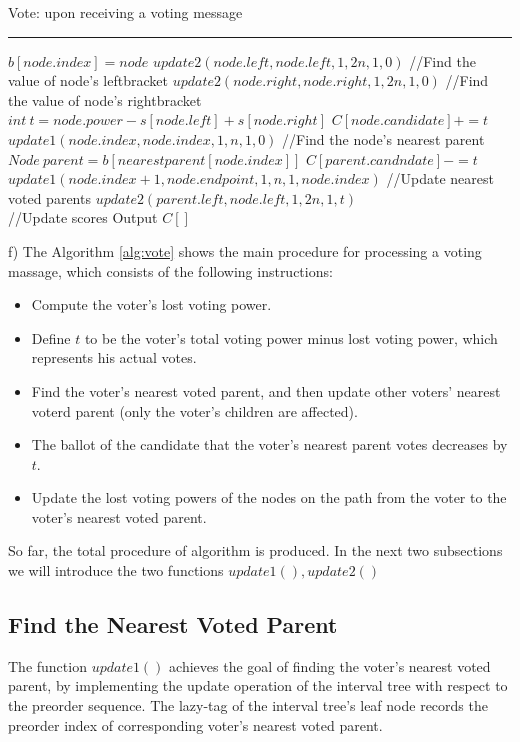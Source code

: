 \begin{algorithm}
	\caption{Vote: upon receiving a voting message}%
	\hrule
	
	$b[node.index]=node$\;
	$update2(node.left,node.left,1,2n,1,0)${\color{gray}
		//Find the value of node's leftbracket}\;
	$update2(node.right,node.right,1,2n,1,0)${\color{gray}
		//Find the value of node's rightbracket}\;
	$int~t=node.power-s[node.left]+s[node.right]$\;
	$C[node.candidate]+=t$\;
	$update1(node.index,node.index,1,n,1,0)${\color{gray}
		//Find the node's nearest parent}\;
	$Node~parent = b[nearestparent[node.index]]$\;
	$C[parent.candndate]-=t$\;
	$update1(node.index+1,node.endpoint,1,n,1,node.index)${\color{gray}
		//Update nearest voted parents}\;
	$update2(parent.left,node.left,1,2n,1,t)${\color{gray}
		\\//Update scores}\;
	Output $C[]$
	\label{alg:vote}
\end{algorithm}

f) The Algorithm \ref{alg:vote} shows the main procedure for processing a voting massage, which consists of the following instructions: 
\begin{itemize}
	\item Compute the voter's lost voting power.
	\item Define $t$ to be the voter's total voting power minus lost voting power, which represents his actual votes. 
	\item Find the voter's nearest voted parent, and then update other voters' nearest voterd parent (only the voter's children are affected).
	\item The ballot of the candidate that the voter's nearest parent votes decreases by $t$.
	\item Update the lost voting powers of the nodes on the path from the voter to the voter's nearest voted parent.
\end{itemize}
So far, the total procedure of algorithm is produced. In the next two subsections we will introduce the two functions $update1(),update2()$ 
\subsection{Find the Nearest Voted Parent}
\label{sec:step2}
The function $update1()$ achieves the goal of finding the voter's nearest voted parent, by implementing the update operation of the interval tree with respect to the preorder sequence. The lazy-tag of the interval tree's leaf node records the preorder index of corresponding voter's nearest voted parent. 

